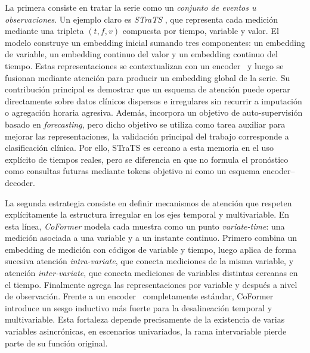 La primera consiste en tratar la serie como un \textit{conjunto de eventos u observaciones}. Un ejemplo claro es \textit{STraTS} \cite{tipirneni2022strats}, que representa cada medición mediante una tripleta $(t,f,v)$ compuesta por tiempo, variable y valor. El modelo construye un embedding inicial sumando tres componentes: un embedding de variable, un embedding continuo del valor y un embedding continuo del tiempo. Estas representaciones se contextualizan con un encoder \Transformer\ y luego se fusionan mediante atención para producir un embedding global de la serie. Su contribución principal es demostrar que un esquema de atención puede operar directamente sobre datos clínicos dispersos e irregulares sin recurrir a imputación o agregación horaria agresiva. Además, incorpora un objetivo de auto-supervisión basado en \emph{forecasting}, pero dicho objetivo se utiliza como tarea auxiliar para mejorar las representaciones, la validación principal del trabajo corresponde a clasificación clínica. Por ello, STraTS es cercano a esta memoria en el uso explícito de tiempos reales, pero se diferencia en que no formula el pronóstico como consultas futuras mediante tokens objetivo ni como un esquema encoder--decoder.

La segunda estrategia consiste en definir mecanismos de atención que respeten explícitamente la estructura irregular en los ejes temporal y multivariable. En esta línea, \textit{CoFormer} \cite{wei2023coformer} modela cada muestra como un punto \emph{variate-time}: una medición asociada a una variable y a un instante continuo. Primero combina un embedding de medición con códigos de variable y tiempo, luego aplica de forma sucesiva atención \emph{intra-variate}, que conecta mediciones de la misma variable, y atención \emph{inter-variate}, que conecta mediciones de variables distintas cercanas en el tiempo. Finalmente agrega las representaciones por variable y después a nivel de observación. Frente a un encoder \Transformer\ completamente estándar, CoFormer introduce un sesgo inductivo más fuerte para la desalineación temporal y multivariable. Esta fortaleza depende precisamente de la existencia de varias variables asincrónicas, en escenarios univariados, la rama intervariable pierde parte de su función original.


